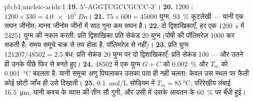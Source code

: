 \begin{solution}{pb:b1:nucleic-acids:1}
\textbf{19.} $5'$-AGGTCGCCGCCC-$3'$।
\textbf{20.} \num{1200} ; $1200\times 330 = \qty{4.0e5}{Da}$।
\textbf{21.} $75\times 600 = \num{45000}$ युग्म, \qty{93}{\%} कूटलेखी
--- यानी एक सघन जीनोम; मानव जीनोम जीनों में साठ गुना कम सघन
है।
\textbf{22.} दो द्विशाखिकाएँ, हर एक \qty{1200}{s} में \num{24251} युग्म
की नकल करती: प्रति द्विशाखिका प्रति सेकंड \qty{20}{} युग्म (पोषी की
पॉलिमरेज़ \qty{1000}{} कर सकती है; समय समूचे चक्र से तय होता है,
पॉलिमरेज़ से नहीं)।
\textbf{23.} प्रति युग्म $\num{121207}/\num{48502} = 2.5$ बंध; प्रति सेकंड 20 युग्म पर दो द्विशाखिकाएँ: प्रति सेकंड 100  --- और उतने ही उनके पीछे फिर से बनते हुए।
\textbf{24.} \num{48502} में एक युग्म $G + C$ को
\qty{0.002}{\%} और $T_m$ को \qty{0.001}{\celsius} बदलता है: यानी समूचा
अणु पिघलाकर उसका पता ही नहीं चलता; केवल उस स्थल पर फैली कोई छोटी जाँच ही
उसे दिखाती।
\textbf{25.} \qty{0.1}{mol/L} सोडियम में $T_m = \qty{85}{\celsius}$;
परिरेखीय लंबाई \qty{16.5}{\micro m}, यानी कवच के व्यास की तीन सौ गुनी,
और उसी में उसके आयतन के \qty{60}{\%} पर बँधी हुई।
\end{solution}
